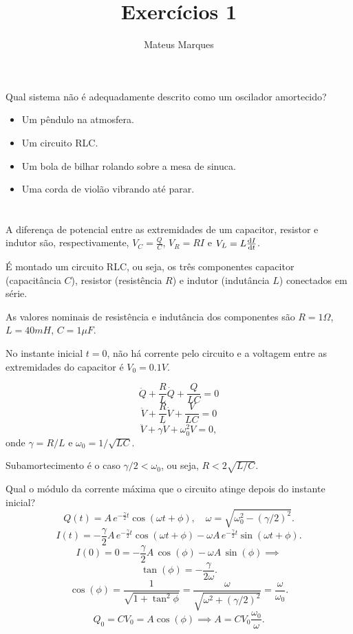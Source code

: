 \documentclass[a4paper,10pt]{article}
\title{\Huge{\textbf{Exercícios 1}}}
\author{Mateus Marques}
\begin{document}
\maketitle

\section{}

Qual sistema não é adequadamente descrito como um oscilador amortecido?

\begin{itemize}
\item Um pêndulo na atmosfera.
\item Um circuito RLC.
\item Um bola de bilhar rolando sobre a mesa de sinuca.
\item Uma corda de violão vibrando até parar.
\end{itemize}


\section{}

A diferença de potencial entre as extremidades de um capacitor, resistor e indutor são, respectivamente, $V_C = \frac{Q}{C}$, $V_R = R I$ e $V_L = L \dv{I}{t}$.

É montado um circuito RLC, ou seja, os três componentes capacitor (capacitância $C$), resistor (resistência $R$) e indutor (indutância $L$) conectados em série.

As valores nominais de resistência e indutância dos componentes são $R = 1 \unit{\Omega}$, $L = 40 \unit{mH}$, $C = 1 \unit{\mu F}$.

No instante inicial $t = 0$, não há corrente pelo circuito e a voltagem entre as extremidades do capacitor é $V_0 = 0.1 \unit{V}$.

$$
\ddot{Q} + \frac{R}{L} \dot{Q} + \frac{Q}{LC} = 0
$$
$$
\ddot{V} + \frac{R}{L} \dot{V} + \frac{V}{LC} = 0
$$
$$
\ddot{V} + \gamma \dot{V} + \omega_0^2 V = 0,
$$
onde $\gamma = R/L$ e $\omega_0 = 1/\sqrt{LC}$.

Subamortecimento é o caso $\gamma/2 < \omega_0$, ou seja, $R < 2 \sqrt{L/C}$.

Qual o módulo da corrente máxima que o circuito atinge depois do instante inicial?
$$
Q(t) = A \, e^{-\frac{\gamma}{2} t} \cos(\omega t + \phi), \quad \omega = \sqrt{\omega_0^2 - (\gamma/2)^2}.
$$
$$
I(t) = - \frac{\gamma}{2} A \, e^{-\frac{\gamma}{2} t} \cos(\omega t + \phi) - \omega A \, e^{-\frac{\gamma}{2} t} \sin(\omega t + \phi).
$$
$$
I(0) = 0 = - \frac{\gamma}{2} A \, \cos(\phi) - \omega A \, \sin(\phi) \implies
$$
$$
\tan(\phi) = -\frac{\gamma}{2 \omega}.
$$
$$
\cos(\phi) = \frac{1}{\sqrt{1+\tan^2\phi}} = \frac{\omega}{\sqrt{\omega^2 + (\gamma/2)^2}} = \frac{\omega}{\omega_0}.
$$
$$
Q_0 = CV_0 = A \cos(\phi) \implies A = C V_0 \frac{\omega_0}{\omega}.
$$
\end{document}
